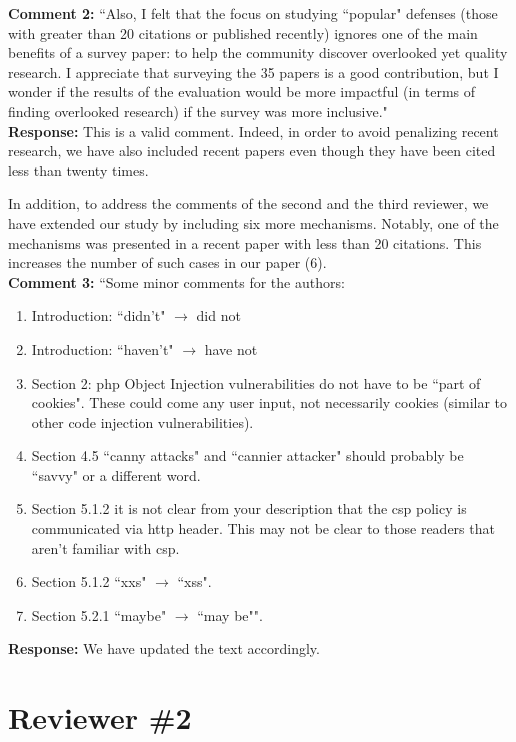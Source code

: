 \documentclass[10pt,journal,compsoc]{IEEEtran}
\begin{document}
\noindent
{\bf Comment 2:} ``Also, I felt that the focus on
studying ``popular" defenses (those with
greater than 20 citations or published recently) ignores one of the	
main benefits of a survey paper: to help the community discover
overlooked yet quality research. I appreciate that surveying the 35
papers is a good contribution, but I wonder if the results of the
evaluation would be more impactful (in terms of finding overlooked
research) if the survey was more inclusive."\\

\noindent
{\bf Response:}
This is a valid comment.
Indeed,
in order to avoid penalizing recent research,
we have also included recent papers
even though they have been cited less than twenty times.

In addition,
to address the comments of the second
and the third reviewer,
we have extended our study by
including six more mechanisms.
Notably,
one of the mechanisms was presented in a recent
paper with less than 20 citations.
This increases the number of such cases
in our paper (6).\\

\noindent
{\bf Comment 3:} ``Some minor comments for the authors:
\begin{enumerate}
\item Introduction: ``didn't" $\rightarrow$ did not
\item Introduction: ``haven't" $\rightarrow$ have not
\item Section 2: {\sc php} Object Injection vulnerabilities do not have to be
 ``part of cookies". These could come any user input, not necessarily
 cookies (similar to other code injection vulnerabilities).
\item Section 4.5 ``canny attacks" and ``cannier attacker" should probably
 be ``savvy" or a different word.
\item Section 5.1.2 it is not clear from your description that the {\sc csp}
 policy is communicated via {\sc http} header. This may not be clear to
 those readers that aren't familiar with {\sc csp}.
\item Section 5.1.2 ``{\sc xxs}" $\rightarrow$ ``{\sc xss}".
\item Section 5.2.1 ``maybe" $\rightarrow$ ``may be"".
\end{enumerate}

\noindent
{\bf Response:}
We have updated the text accordingly.\\

\section{Reviewer \#2}
\label{sec:r2}
\end{document}
